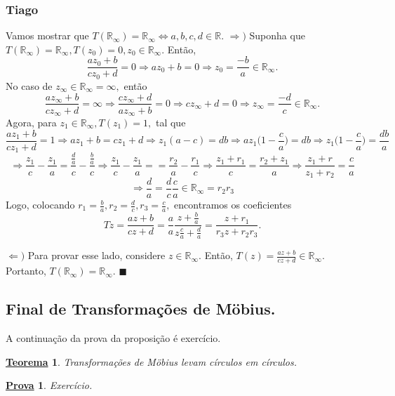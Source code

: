 \documentclass{article}
\newtheorem*{theorem*}{\underline{Teorema}}
\newtheorem*{proof*}{\underline{Prova}}
\renewcommand\qedsymbol{$\blacksquare$}
\begin{document}
\subsubsection{Tiago}
  Vamos mostrar que $T(\mathbb{R}_\infty) = \mathbb{R}_{\infty}\Longleftrightarrow a, b, c, d\in \mathbb{R}$.
 $\Rightarrow)$ Suponha que $T(\mathbb{R}_\infty) = \mathbb{R}_\infty, T(z_{0}) = 0, z_{0}\in \mathbb{R}_\infty.$ Ent\~ao,
  $$
  \frac{az_{0} + b}{cz_{0} + d} = 0\Rightarrow az_{0} + b = 0\Rightarrow z_{0} = \frac{-b}{a}\in \mathbb{R}_\infty. 
  $$
  No caso de $z_\infty \in \mathbb{R}_\infty = \infty, $ ent\~ao
  $$
  \frac{az_{\infty} + b}{cz_{\infty} + d} = \infty\Rightarrow \frac{cz_{\infty} + d}{az_{\infty} + b} = 0\Rightarrow cz_\infty + d = 0
\Rightarrow z_\infty = \frac{-d}{c}\in \mathbb{R}_\infty.
  $$
  Agora, para $z_{1}\in \mathbb{R}_{\infty}, T(z_{1}) = 1,$ tal que 
  $$
    \frac{az_{1} + b}{cz_{1} + d} = 1\Rightarrow az_{1} + b = cz_{1} + d\Rightarrow z_{1}(a - c) = db\Rightarrow az_{1}\biggl(1 - \frac{c}{a}\biggr) = db
 \Rightarrow z_{1}\biggl(1 - \frac{c}{a}\biggr) = \frac{db}{a}
  $$
  $$
  \Rightarrow \frac{z_{1}}{c} - \frac{z_1}{a} = \frac{\frac{d}{a}}{c} - \frac{\frac{b}{a}}{c}\Rightarrow \frac{z_1}{c} - \frac{z_1}{a} =
= \frac{r_2}{a} - \frac{r_1}{c}\Rightarrow \frac{z_1 + r_1}{c} = \frac{r_2 + z_1}{a}\Rightarrow \frac{z_1 + r}{z_1 + r_2} = \frac{c}{a}
  $$
  $$
 \Rightarrow \frac{d}{a} = \frac{d}{c}\frac{c}{a}\in \mathbb{R}_{\infty} = r_2r_3
  $$
  Logo, colocando $r_{1} = \frac{b}{a}, r_2 = \frac{d}{c}, r_3 = \frac{c}{a},$ encontramos os coeficientes
  $$
    Tz = \frac{az + b}{cz + d} = \frac{a}{a}\frac{z + \frac{b}{a}}{z \frac{c}{a} + \frac{d}{a}} = \frac{z + r_1}{r_3z + r_2r_3}.
  $$

  $\Leftarrow)$ Para provar esse lado, considere $z\in \mathbb{R}_\infty.$ Ent\~ao, $T(z) = \frac{az + b}{cz + d}\in \mathbb{R}_\infty.$ Portanto,
  $T(\mathbb{R}_\infty) = \mathbb{R}_\infty.$  \qedsymbol

  \subsection{Final de Transforma\c c\~oes de M\"{o}bius.}
  A continua\c c\~ao da prova da proposi\c c\~ao \'e exerc\'icio.
 \begin{theorem*}
   Transforma\c c\~oes de M\"{o}bius levam c\'irculos em c\'irculos.
 \end{theorem*}
\begin{proof*}
  Exerc\'icio.
\end{proof*}
\end{document}
